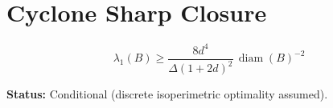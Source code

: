 \documentclass{article}
\begin{document}
\section*{Cyclone Sharp Closure}

\[
\lambda_1(B)\ge
\frac{8d^4}{\Delta(1+2d)^2}\,\operatorname{diam}(B)^{-2}
\]

\textbf{Status:} Conditional (discrete isoperimetric optimality assumed).
\end{document}
